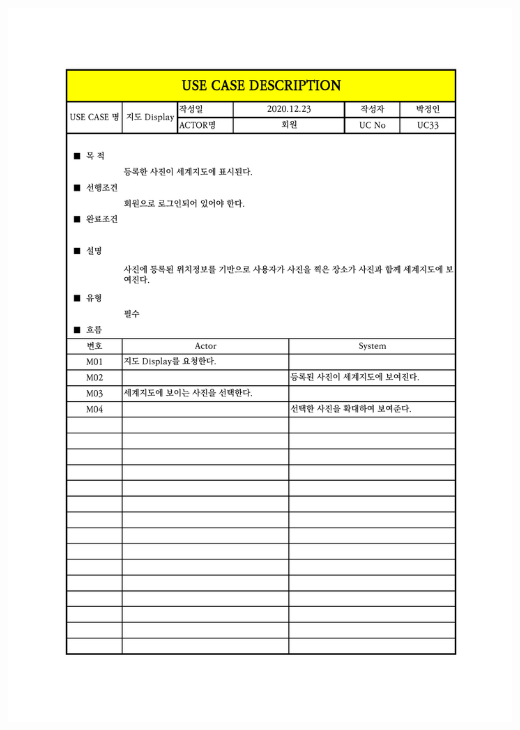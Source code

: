 {{{{{{{{{{{{{{{{{{{{{{{{{{{{{{{{{{{\includegraphics[width=1.1\textwidth]{./Figure/Design/Display/usecase/033.pdf} \\
}}}}}}}}}}}}}}}}}}}}}}}}}}}}}}}}}}}

